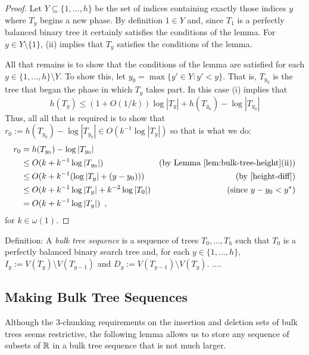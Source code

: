 \documentclass[kpfonts]{patmorin}
\newcommand{\snote}[1]{\fcolorbox{red}{yellow}{#1}}
\begin{document}
\begin{proof}
  Let $Y\subseteq\{1,\ldots,h\}$ be the set of indices containing exactly those indices $y$ where $T_y$ begins a new phase. By definition $1\in Y$ and, since $T_1$ is a perfectly balanced binary tree it certainly satisfies the conditions of the lemma.  For $y\in Y\setminus\{1\}$, 
  (ii) implies that $T_y$ satisfies the conditions of the lemma.  
  
  All that remains is to show that the conditions of the lemma are satisfied for each $y\in\{1,\ldots,h\}\setminus Y$. To show this, let $y_0=\max\{ y'\in Y: y'<y\}$.  That is, $T_{y_0}$ is the tree that began the phase in which $T_y$ takes part.  In this case (i) implies that
  \[  h(T_y) \le (1+O(1/k))\log |T_y| + h(T_{y_0})-\log|T_{y_0}| \]  
  Thus, all all that is required is to show that $r_0:=h(T_{y_0})-\log|T_{y_0}|\in O(k^{-1}\log|T_y|)$ so that is what we do:
  \begin{align*}
    r_0 &= h(T_{y_0})-\log|T_{y_0}| \\
       &\le O(k + k^{-1}\log|T_{y_0}|) 
        & \text{(by \lemref{bulk-tree-height}(ii))}\\
       &\le O(k + k^{-1}(\log|T_{y}| + (y-y_0))) 
        & \text{(by \eqref{height-diff})} \\
       &\le O(k + k^{-1}\log|T_{y}| + k^{-2}\log|T_0|) 
        & \text{(since $y-y_0 < y^*$)}\\
       &= O(k + k^{-1}\log|T_{y}|) \enspace ,
  \end{align*}
  for $k\in\omega(1)$. 
\end{proof}

Definition: A \emph{bulk tree sequence} is a sequence of trees $T_0,\ldots,T_h$ such that $T_0$ is a perfectly balanced binary search tree and, for each $y\in\{1,\ldots,h\}$, $I_y:=V(T_y)\setminus V(T_{y-1})$ and $D_y:= V(T_{y-1})\setminus V(T_y)$.  ....

\subsection{Making Bulk Tree Sequences}

Although the 3-chunking requirements on the insertion and deletion sets of bulk trees seems restrictive, the following lemma allows us to store any sequence of subsets of $\mathbb{R}$ in a bulk tree sequence that is not much larger.
\end{document}
